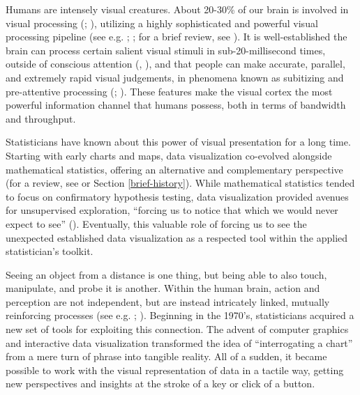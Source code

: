 \documentclass[
]{book}
\begin{document}
Humans are intensely visual creatures. About 20-30\% of our brain is involved in visual processing (; ), utilizing a highly sophisticated and powerful visual processing pipeline (see e.g. ; ; for a brief review, see ). It is well-established the brain can process certain salient visual stimuli in sub-20-millisecond times, outside of conscious attention (, ), and that people can make accurate, parallel, and extremely rapid visual judgements, in phenomena known as subitizing and pre-attentive processing (; ). These features make the visual cortex the most powerful information channel that humans possess, both in terms of bandwidth and throughput.

Statisticians have known about this power of visual presentation for a long time. Starting with early charts and maps, data visualization co-evolved alongside mathematical statistics, offering an alternative and complementary perspective (for a review, see  or Section \ref{brief-history}). While mathematical statistics tended to focus on confirmatory hypothesis testing, data visualization provided avenues for unsupervised exploration, ``forcing us to notice that which we would never expect to see'' (). Eventually, this valuable role of forcing us to see the unexpected established data visualization as a respected tool within the applied statistician's toolkit.

Seeing an object from a distance is one thing, but being able to also touch, manipulate, and probe it is another. Within the human brain, action and perception are not independent, but are instead intricately linked, mutually reinforcing processes (see e.g. ; ). Beginning in the 1970's, statisticians acquired a new set of tools for exploiting this connection. The advent of computer graphics and interactive data visualization transformed the idea of ``interrogating a chart'' from a mere turn of phrase into tangible reality. All of a sudden, it became possible to work with the visual representation of data in a tactile way, getting new perspectives and insights at the stroke of a key or click of a button.
\end{document}
